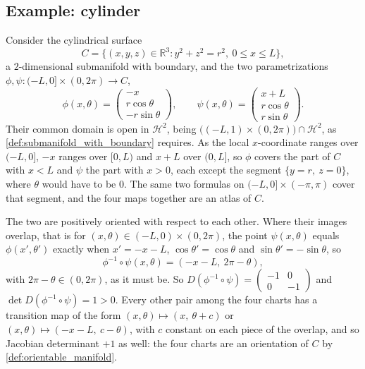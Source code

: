 \subsection{Example: cylinder}
\label{sec:cylinder_orientation_example}

Consider the cylindrical surface
\[C = \{(x,y,z) \in \mathbb{R}^3 : y^2+z^2 = r^2,\ 0\leq x\leq L\},\]
a $2$-dimensional submanifold with boundary, and the two parametrizations $\phi,\psi :
(-L,0]\times(0,2\pi) \to C$,
\[\phi(x,\theta) = \begin{pmatrix} -x \\ r\cos\theta \\ -r\sin\theta \end{pmatrix}, \qquad
  \psi(x,\theta) = \begin{pmatrix} x+L \\ r\cos\theta \\ r\sin\theta \end{pmatrix}.\]
Their common domain is open in $\mathcal{H}^2$, being
$\big((-L,1)\times(0,2\pi)\big) \cap \mathcal{H}^2$, as \cref{def:submanifold_with_boundary}
requires. As the local $x$-coordinate ranges over $(-L,0]$, $-x$ ranges over $[0,L)$ and $x+L$
over $(0,L]$, so $\phi$ covers the part of $C$ with $x < L$ and $\psi$ the part with $x > 0$, each
except the segment $\{y = r,\ z = 0\}$, where $\theta$ would have to be $0$. The same two formulas
on $(-L,0]\times(-\pi,\pi)$ cover that segment, and the four maps together are an atlas of $C$.

The two are positively oriented with respect to each other. Where their images overlap, that is
for $(x,\theta) \in (-L,0)\times(0,2\pi)$, the point $\psi(x,\theta)$ equals $\phi(x',\theta')$
exactly when $x' = -x-L$, $\cos\theta' = \cos\theta$ and $\sin\theta' = -\sin\theta$, so
\[\phi^{-1}\circ\psi(x,\theta) = (-x-L,\ 2\pi-\theta),\]
with $2\pi-\theta \in (0,2\pi)$, as it must be. So $D(\phi^{-1}\circ\psi) =
\begin{pmatrix}-1&0\\0&-1\end{pmatrix}$ and $\det D(\phi^{-1}\circ\psi) = 1 > 0$. Every other pair
among the four charts has a transition map of the form $(x,\theta) \mapsto (x,\ \theta+c)$ or
$(x,\theta) \mapsto (-x-L,\ c-\theta)$, with $c$ constant on each piece of the overlap, and so
Jacobian determinant $+1$ as well: the four charts are an orientation of $C$ by
\cref{def:orientable_manifold}.

